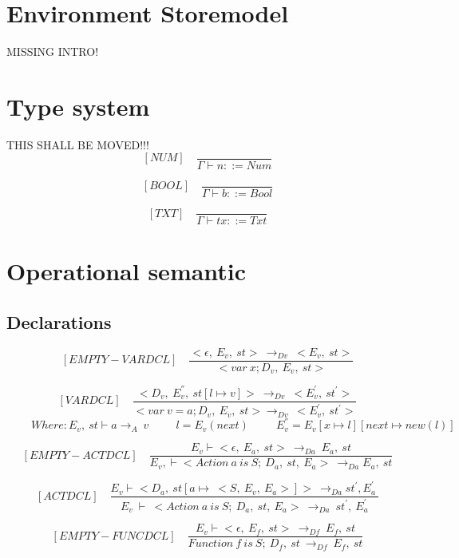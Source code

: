   
  \section{Environment Storemodel}
  MISSING INTRO!
  
  
  
  \section{Type system}
  THIS SHALL BE MOVED!!!
	\[
	[NUM] \quad
	\dfrac{}{\Gamma \vdash n ::= Num}
	\]
	 
	\[
	[BOOL] \quad
	\dfrac{}{\Gamma \vdash b ::= Bool}
	\]
	
  	\[
  	[TXT] \quad
  	\dfrac{}{\Gamma \vdash tx ::= Txt}
  	\]
  	
  \section{Operational semantic}
  
  \subsection{Declarations}
  	\[
	[EMPTY-VARDCL] \quad
	\dfrac{<\epsilon, \ E_v, \ st> \ \rightarrow_{Dv} \ <E_v, \ st> }{<var \ x; D_v,\ E_v,\ st>}
	\]
    	
   	\[
   	[VARDCL] \quad
   	\dfrac{<D_v, \ E_v^{''}, \ st[l \mapsto v]> \ \rightarrow_{Dv} \ <E_v^{'}, \ st^{'}> }{<var \ v = a; D_v,\ E_v,\ st> \rightarrow_{Dv} \ <E_v^{'}, \ st^{'}>}
   	\]
   	\begin{math}
 	  	\qquad \ Where: E_v, \ st \vdash a \rightarrow_A \ v
 	  	\qquad \ \ l = E_v(next)
 	  	\qquad \ \ E_v^{''} = E_v[x \mapsto l][next \mapsto new(l)]
   	\end{math}
    	
   	\[
   	[EMPTY-ACTDCL] \quad
   	\dfrac{E_v \vdash <\epsilon, \ E_a, \ st> \ \rightarrow_{Da} \ E_a, \ st}{ E_v, \vdash  <Action \ a \ is \ S; \ D_a, \ st, \ E_a> \ \rightarrow_{Da} E_a, \ st }
   	\]
    	
    	
  	\[
   	[ACTDCL] \quad
   	\dfrac{E_v \vdash <D_a, \ st[a \mapsto \ <S, \ E_v, \ E_a>]>   \ \rightarrow_{Da} st^{'}, E_a^{'} \ }{E_v \ \vdash \ <Action \ a \ is \ S; \ D_a, \ st, \ E_a> \ \rightarrow_{Da} \ st^{'}, \ E_a^{'}}
   	\]
    	
   	\[
   	[EMPTY-FUNCDCL] \quad
   	\dfrac{E_v \vdash < \epsilon, \ E_f, \ st> \ \rightarrow_{Df} \ E_f, \ st}{Function \ f \ is \ S; \ D_f, \ st \ \rightarrow_{Df} \ E_f, \ st}
   	\]
   	
